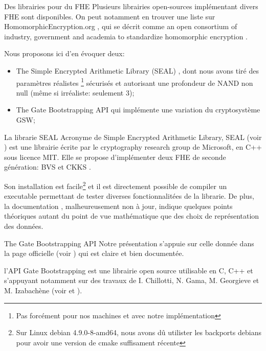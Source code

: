 \begin{section}{Des librairies pour du FHE}
Plusieurs librairies open-sources implémentant divers FHE sont disponibles. 
On peut notamment en trouver une liste sur HomomorphicEncryption.org \cite{homencrypt.org}, 
qui se décrit comme \og an open consortium of industry, government and academia to 
standardize homomorphic encryption \fg.

Nous proposons ici d'en évoquer deux:
\begin{itemize}
\item The Simple Encrypted Arithmetic Library (SEAL) \cite{seal}, dont nous avons tiré des paramètres  
\og réalistes \fg\footnote{Pas forcément pour nos machines et avec notre implémentation}
sécurisés et autorisant une profondeur de NAND non null (même si irréaliste: seulement 3);
\item The Gate Bootstrapping API \cite{TFHE} qui implémente une variation du cryptosystème GSW;
\end{itemize}

\begin{subsection}{La librarie SEAL}
Acronyme de Simple Encrypted Arithmetic Library, SEAL (voir \cite{seal}) 
est une librairie écrite par le \og cryptography research group \fg de Microsoft, en C++ sous 
licence MIT. Elle se propose d'implémenter deux FHE de seconde génération: 
BVS \cite{EPRINT:FanVer12} et CKKS \cite{AC:CKKS17}.

Son installation est facile\footnote{Sur Linux debian 4.9.0-8-amd64, nous avons dû
utilister les backports debians pour avoir une version de cmake suffisament récente}
et il est directement possible de compiler un executable permettant de tester 
diverses fonctionnalitées de la librarie. De plus, la documentation
\cite{seal_manual_231},
malheureusement non à jour, indique quelques points théoriques autant du point 
de vue mathématique que des choix de représentation des données.
\end{subsection}

\begin{subsection}{The Gate Bootstrapping API}
Notre présentation s'appuie sur celle donnée dans la page officielle (voir \cite{TFHE})
 qui est claire et bien documentée.

l'API Gate Bootstrapping est une librairie open source utilisable en C, C++ et 
s'appuyant notamment sur des travaux de I. Chillotti, N. Gama, M. Georgieve et M. Izabachène 
(voir \cite{cryptoeprint:2017:430} et  \cite{cryptoeprint:2016:870}). 


\end{subsection}
\end{section}
